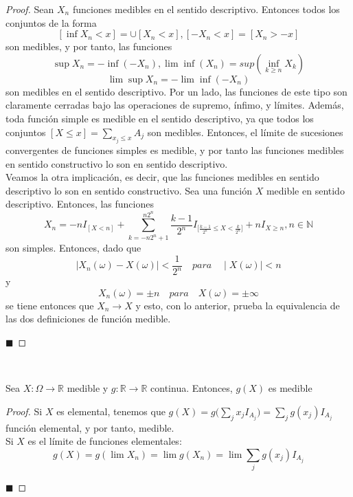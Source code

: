 \documentclass[12pt,a4paper]{book}
\newcommand*{\qed}{\hfill\ensuremath{\blacksquare}}
\begin{document}
\begin{proof}
Sean $X_n$ funciones medibles en el sentido descriptivo. Entonces todos los conjuntos de la forma
$$[\inf X_n < x] = \cup [X_n < x], [-X_n < x] = [X_n > -x]$$
son medibles, y por tanto, las funciones
$$\sup X_n = - \inf (-X_n), \lim \inf (X_n) = sup (\inf_{k \geq n} X_k)$$
$$ \lim \sup X_n = - \lim \inf (-X_n)$$
son medibles en el sentido descriptivo. Por un lado, las funciones de este tipo son claramente cerradas bajo las operaciones de supremo, ínfimo, y límites. Además, toda función simple es medible en el sentido descriptivo, ya que todos los conjuntos $[X \leq x] = \displaystyle \sum_{x_j \leq x} A_j$ son medibles. Entonces, el límite de sucesiones convergentes de funciones simples es medible, y por tanto las funciones medibles en sentido constructivo lo son en sentido descriptivo.\\

Veamos la otra implicación, es decir, que las funciones medibles en sentido descriptivo lo son en sentido constructivo. Sea una función $X$ medible en sentido descriptivo. Entonces, las funciones
$$X_n = -nI_{[X < n]} + \sum_{k=-n2^n+1}^{n2^n}\frac{k-1}{2^n}I_{\big[\frac{k-1}{2^n} \leq X < \frac{k}{2^n} \big]} + nI_{X \geq n}, n \in \mathbb{N}$$
son simples. Entonces, dado que
$$\mid X_n(\omega) - X(\omega)\mid < \frac{1}{2^n} \quad para \quad \mid X(\omega)\mid < n$$
y
$$X_n(\omega) = \pm n \quad para \quad  X(\omega) = \pm \infty$$
se tiene entonces que $X_n \to X$ y esto, con lo anterior, prueba la equivalencia de las dos definiciones de función medible.

\qed
\end{proof}


\begin{theorem}
	\ 
	
Sea $X:\Omega \longrightarrow \mathbb{R}$ medible y $g: \mathbb{R} \longrightarrow \mathbb{R}$ continua. Entonces, $ g(X)$ es medible
\end{theorem}

\begin{proof}
Si $X$ es elemental, tenemos que $\displaystyle g(X) = g\Big(\sum_jx_jI_{A_j}\Big)= \sum_j g(x_j)I_{A_j}$ función elemental, y por tanto, medible.\\

Si $X$ es el límite de funciones elementales:
$$g(X) = g(\lim X_n) = \lim g(X_n) = \lim \sum_j g(x_j)I_{A_j}$$

\qed
\end{proof}
\end{document}
